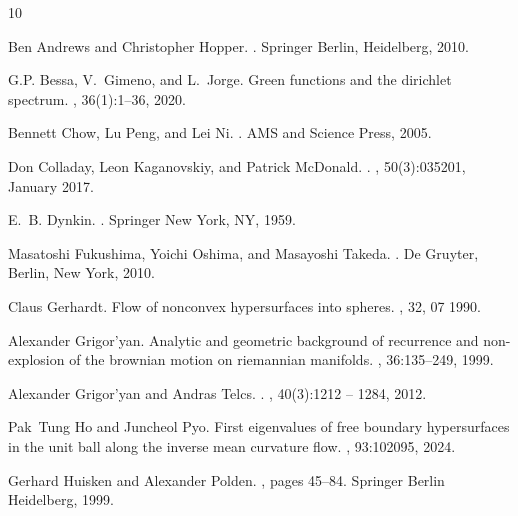 \documentclass{amsart}
\theoremstyle{definition}
\theoremstyle{remark}
\begin{document}
\begin{thebibliography}{10}

Ben { Andrews} and Christopher {Hopper}.
.
\newblock Springer Berlin, Heidelberg, 2010.

G.P. Bessa, V.~Gimeno, and L.~Jorge.
\newblock Green functions and the dirichlet spectrum.
, 36(1):1--36, 2020.

Bennett {Chow}, {Lu} Peng, and Lei {Ni}.
.
\newblock AMS and Science Press, 2005.

Don {Colladay}, Leon {Kaganovskiy}, and Patrick {McDonald}.
.
, 50(3):035201,
  January 2017.

E.~B. {Dynkin}.
.
\newblock Springer New York, NY, 1959.

Masatoshi Fukushima, Yoichi Oshima, and Masayoshi Takeda.
.
\newblock De Gruyter, Berlin, New York, 2010.

Claus {Gerhardt}.
\newblock Flow of nonconvex hypersurfaces into spheres.
, 32, 07
  1990.

Alexander {Grigor’yan}.
\newblock Analytic and geometric background of recurrence and non-explosion of
  the brownian motion on riemannian manifolds.
, 36:135–249,
  1999.

Alexander {Grigor’yan} and Andras {Telcs}.
.
, 40(3):1212 -- 1284, 2012.

Pak~Tung Ho and Juncheol Pyo.
\newblock First eigenvalues of free boundary hypersurfaces in the unit ball
  along the inverse mean curvature flow.
, 93:102095, 2024.

Gerhard {Huisken} and Alexander {Polden}.
, pages 45--84.
\newblock Springer Berlin Heidelberg, 1999.


\end{thebibliography}
\end{document}
